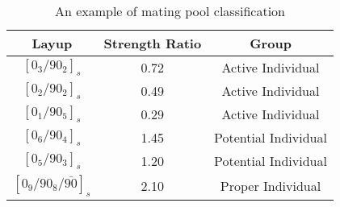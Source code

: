 \begin{table}[ht]
\caption{An example of mating pool classification}
\centering
\begin{adjustbox}{width=1\textwidth}
\label{tab:mat}
\begin{tabular}{ccc}
\toprule
Layup							 	       & Strength Ratio    & Group                \\
\midrule
$[0_{3}/90_{2}]_s$                		   & 0.72             & Active  Individual       \\
$[0_{2}/90_{2}]_s$                		   & 0.49             & Active  Individual       \\
$[0_{1}/90_{5}]_s$                		   & 0.29             & Active  Individual       \\
$[0_{6}/90_{4}]_s$                		   & 1.45             & Potential Individual       \\
$[0_{5}/90_{3}]_s$                		   & 1.20             & Potential Individual       \\
$[0_{9}/90_{8}/\bar{90}]_s$                & 2.10             & Proper Individual \\
\bottomrule
\end{tabular}
\end{adjustbox}
\end{table}
